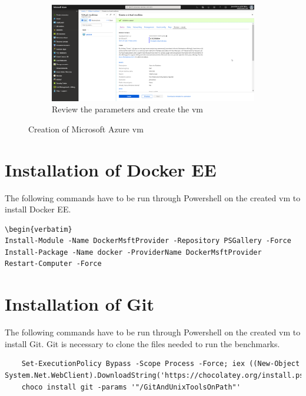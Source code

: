 \begin{figure}[h]\ContinuedFloat
	\begin{subfigure}{\textwidth}
		\captionsetup{width=0.9\linewidth}
		\includegraphics[width=\linewidth]{img/Container_VM_2.png}
		\centering
		\caption{Review the parameters and create the \acrshort{vm}}
		\label{fig:Container_VM_2}
	\end{subfigure}
	\caption{Creation of Microsoft Azure \acrshort{vm}}
	\label{fig:Container_VM}
\end{figure}
\clearpage
\section{Installation of Docker EE}
The following commands have to be run through Powershell on the created \acrshort{vm} to install Docker EE.
\begin{verbatim}
\begin{verbatim}
Install-Module -Name DockerMsftProvider -Repository PSGallery -Force
Install-Package -Name docker -ProviderName DockerMsftProvider
Restart-Computer -Force
\end{verbatim}
\section{Installation of Git}
The following commands have to be run through Powershell on the created \acrshort{vm} to install Git. Git is necessary to clone the files needed to run the benchmarks.
\begin{verbatim}
	Set-ExecutionPolicy Bypass -Scope Process -Force; iex ((New-Object System.Net.WebClient).DownloadString('https://chocolatey.org/install.ps1'))
	choco install git -params '"/GitAndUnixToolsOnPath"'
\end{verbatim}
